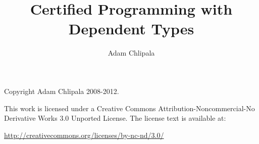 \documentclass[12pt]{report}
\title{Certified Programming with Dependent Types}
\author{Adam Chlipala}
\begin{document}
\maketitle

\thispagestyle{empty}
\mbox{}\vfill
\begin{center}

Copyright Adam Chlipala 2008-2012.


This work is licensed under a
Creative Commons Attribution-Noncommercial-No Derivative Works 3.0
Unported License.
The license text is available at:

\end{center}

\begin{center} \url{http://creativecommons.org/licenses/by-nc-nd/3.0/} \end{center}

\tableofcontents




















\clearpage
{}



\clearpage
{}
\printindex
\end{document}
